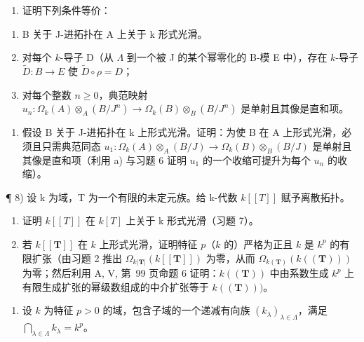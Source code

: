 \begin{enumerate}
\def\labelenumi{\alph{enumi})}
\tightlist
\item
  证明下列条件等价：
\end{enumerate}

\begin{enumerate}
\def\labelenumi{(\roman{enumi})}
\item
  B 关于 J-进拓扑在 A 上关于 k 形式光滑。
\item
  对每个 \(k\)-导子 D（从 \(\Lambda\) 到一个被 J 的某个幂零化的 B-模 E 中），存在 \(k\)-导子 \(\tilde{D}: B \to E\) 使 \(\tilde{D} \circ \rho = D\)；
\item
  对每个整数 \(n \geqslant 0\)，典范映射 \(u_n: \Omega_k(A) \otimes_A (B/J^n) \longrightarrow \Omega_k(B) \otimes_B (B/J^n)\) 是单射且其像是直和项。
\end{enumerate}

\begin{enumerate}
\def\labelenumi{\alph{enumi})}
\setcounter{enumi}{1}
\tightlist
\item
  假设 B 关于 J-进拓扑在 k 上形式光滑。证明：为使 B 在 A 上形式光滑，必须且只需典范同态 \(u_{1}:\Omega_{k}(A)\otimes_{A}(B/J)\to\Omega_{k}(B)\otimes_{B}(B/J)\) 是单射且其像是直和项（利用 a) 与习题 6 证明 \(u_{1}\) 的一个收缩可提升为每个 \(u_{n}\) 的收缩）。
\end{enumerate}

¶ 8) 设 k 为域，T 为一个有限的未定元族。给 k-代数 \(k[[T]]\) 赋予离散拓扑。

\begin{enumerate}
\def\labelenumi{\alph{enumi})}
\item
  证明 \(k[[T]]\) 在 \(k[T]\) 上关于 k 形式光滑（习题 7）。
\item
  若 \(k[[\mathbf{T}]]\) 在 \(k\) 上形式光滑，证明特征 \(p\)（\(k\) 的）严格为正且 \(k\) 是 \(k^p\) 的有限扩张（由习题 2 推出 \(\Omega_{k|\mathbf{T}|}(k[[\mathbf{T}]])\) 为零，从而 \(\Omega_{k(\mathbf{T})}(k((\mathbf{T})))\) 为零；然后利用 A, V, 第~99 页命题 6 证明：\(k((\mathbf{T}))\) 中由系数生成 \(k^p\) 上有限生成扩张的幂级数组成的中介扩张等于 \(k((\mathbf{T})))\)。
\end{enumerate}

\begin{enumerate}
\def\labelenumi{\arabic{enumi})}
\setcounter{enumi}{8}
\tightlist
\item
  设 \(k\) 为特征 \(p > 0\) 的域，包含子域的一个递减有向族 \((k_{\lambda})_{\lambda \in \Lambda}\)，满足 \(\bigcap_{\lambda \in \Lambda} k_{\lambda} = k^{p}\)。
\end{enumerate}

